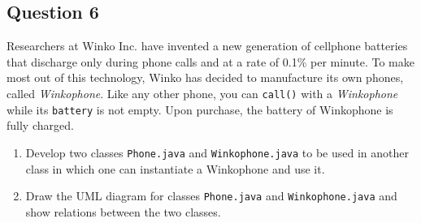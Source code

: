 \documentclass[12pt,letterpaper,twoside]{article}
\begin{document}
\newpage

\subsection*{Question 6}

Researchers at Winko Inc. have invented a new generation of cellphone batteries that discharge only during phone calls and at a rate of 0.1\% per minute. To make most out of this technology, Winko has decided to manufacture its own phones, called \textit{Winkophone}. Like any other phone, you can \texttt{call()} with a \textit{Winkophone} while its \texttt{battery} is not empty. Upon purchase, the battery of Winkophone is fully charged.

\begin{enumerate}[label=(\alph*)]
	\item Develop two classes \texttt{Phone.java} and \texttt{Winkophone.java} to be used in another class in which one can instantiate a Winkophone and use it.
	\item Draw the UML diagram for classes \texttt{Phone.java} and \texttt{Winkophone.java} and show relations between the two classes.
\end{enumerate}

\end{document}
